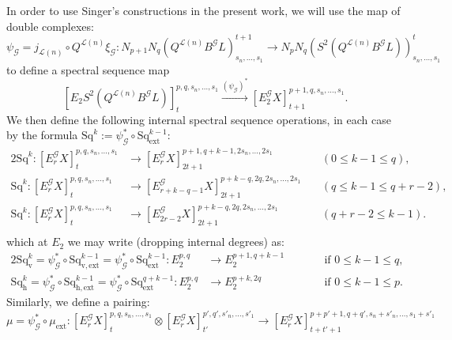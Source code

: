 \documentclass[11pt]{amsart} \renewcommand{\baselinestretch}{1.2}
\theoremstyle{plain}
\numberwithin{equation}{section} %
\theoremstyle{plain}
\numberwithin{equation}{chapter} %
\renewcommand{\to}{\longrightarrow}
\newcommand{\scrG}{\mathscr{G}}
\newcommand{\calL}{\mathcal{L}}
\newcommand{\BSW}{{\scrG}}
\newcommand{\BSWres}{B^\BSW}%
\newcommand{\ExtCohOp}{\mathrm{Sq}_\mathrm{ext}}
\newcommand{\vExtCohOp}{\mathrm{Sq}_\mathrm{v,ext}}
\newcommand{\hExtCohOp}{\mathrm{Sq}_\mathrm{h,ext}}
\newcommand{\ExtCohProd}{\mu_\mathrm{ext}}
\newcommand{\Sq}{\mathrm{Sq}}
\newcommand{\Edownup}[5]{[E_{#1}^{#2}#3]^{#4}_{#5}}
\newcommand{\dver}{_\mathrm{v}}
\newcommand{\dhor}{_\mathrm{h}}
\newcommand{\Sqh}{\mathrm{Sq}\dhor}
\newcommand{\Sqv}{\mathrm{Sq}\dver}
\begin{document}
\begin{Operations in composite functor spectral sequences}
In order to use Singer's constructions in the present work, we will use the map of double complexes:
\[\psi_\BSW=j_{\calL(n)}\circ Q^{\calL(n)}\xi_\BSW:N_{p+1}N_q(Q^{\calL(n)}\BSWres L)_{s_n,\ldots,s_1}^{t+1}\to N_{p}N_q(S^2(Q^{\calL(n)}\BSWres L))_{s_n,\ldots,s_1}^{t}\]
to define a spectral sequence map
\[\Edownup{2}{}{S^2(Q^{\calL(n)}\BSWres L)}{p,q,s_n,\ldots,s_1}{t} \overset{(\psi_\BSW)^*}{\to}  \Edownup{2}{\BSW}{X}{p+1,q,s_n,\ldots,s_1}{t+1}.\]
We  then define the following internal spectral sequence operations, in each case by the formula $\Sq^k:=\psi_\BSW^*\circ\ExtCohOp^{k-1}$:
\begin{alignat*}{2}
%
%
\Sq^k:
\Edownup{r}{\BSW}{X}{p,q,s_n,\ldots,s_1}{t}
&\to 
\Edownup{r}{\BSW}{X}{p+1,q+k-1,2s_n,\ldots,2s_1}{2t+1}
&&(0\leq k-1 \leq q),\\
\Sq^k:
\Edownup{r}{\BSW}{X}{p,q,s_n,\ldots,s_1}{t}
&\to 
\Edownup{r+k-q-1}{\BSW}{X}{p+k-q,2q,2s_n,\ldots,2s_1}{2t+1}
&&(q\leq k-1\leq q+r-2),\\
\Sq^k:
\Edownup{r}{\BSW}{X}{p,q,s_n,\ldots,s_1}{t}
&\to 
\Edownup{2r-2}{\BSW}{X}{p+k-q,2q,2s_n,\ldots,2s_1}{2t+1}
&\ &(q+r-2\leq k-1).\\
%
\end{alignat*}
which at $E_2$ we may write (dropping internal degrees) as:
\begin{alignat*}{2}
\Sqv^k=\psi_\BSW^*\circ\vExtCohOp^{k-1}= \psi_\BSW^*\circ\ExtCohOp^{k-1}:E^{p,q}_2&\to E^{p+1,q+k-1}_2&\qquad&\text{if }0\leq k-1 \leq q,\\
\Sqh^k=\psi_\BSW^*\circ\hExtCohOp^{k-1}= \psi_\BSW^*\circ\ExtCohOp^{q+k-1}:E^{p,q}_2&\to E^{p+k,2q}_2&\qquad&\text{if }0\leq k-1 \leq p.
\end{alignat*}
Similarly, we   define a pairing:
\[\mu=\psi_\BSW^*\circ\ExtCohProd: \Edownup{r}{\BSW}{X}{p,q,s_n,\ldots,s_1}{t} \otimes \Edownup{r}{\BSW}{X}{p',q',s'_n,\ldots,s'_1}{t'}\to \Edownup{r}{\BSW}{X}{p+p'+1,q+q',s_n+s'_n,\ldots,s_1+s'_1}{t+t'+1}\]


\end{Operations in composite functor spectral sequences}
\end{document}
